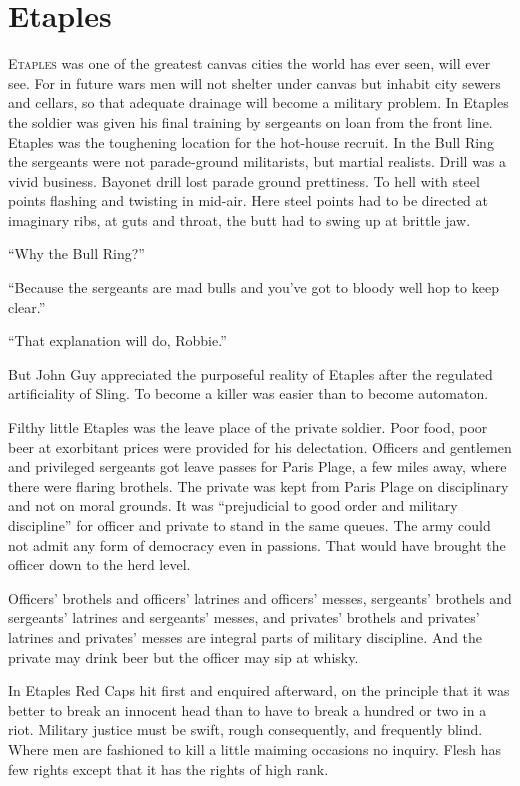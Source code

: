 \chapter*{\textsf{Etaples}}

E\textsc{taples} was one of the greatest canvas cities the world has 
ever seen, will ever see. For in future wars men will not shelter under 
canvas but inhabit city sewers and cellars, so that adequate drainage will 
become a military problem. In Etaples the soldier was given his final 
training by sergeants on loan from the front line. Etaples was the 
toughening location for the hot-house recruit. In the Bull Ring the 
sergeants were not parade-ground militarists, but martial realists. Drill 
was a vivid business. Bayonet drill lost parade ground prettiness. To 
hell with steel points flashing and twisting in mid-air. Here steel 
points had to be directed at imaginary ribs, at guts and throat, the 
butt had to swing up at brittle jaw.

``Why the Bull Ring?''

``Because the sergeants are mad bulls and you've got to bloody well hop to 
keep clear.''

``That explanation will do, Robbie.''

But John Guy appreciated the purposeful reality of Etaples after the 
regulated artificiality of Sling. To become a killer was easier than to 
become automaton.

Filthy little Etaples was the leave place of the private soldier. Poor food, 
poor beer at exorbitant prices were provided for his delectation. Officers 
and gentlemen and privileged sergeants got leave passes for Paris Plage, 
a few miles away, where there were flaring brothels. The private was kept 
from Paris Plage on disciplinary and not on moral grounds. It was ``prejudicial 
to good order and military discipline'' for officer and private to stand in the 
same queues. The army could not admit any form of democracy even in passions. 
That would have brought the officer down to the herd level.

Officers' brothels and officers' latrines and officers' messes, sergeants' 
brothels and sergeants' latrines and sergeants' messes, and privates' 
brothels and privates' latrines and privates' messes are integral parts of 
military discipline. And the private may drink beer but the officer may sip 
at whisky.

In Etaples Red Caps hit first and enquired afterward, on the principle that 
it was better to break an innocent head than to have to break a hundred or 
two in a riot. Military justice must be swift, rough consequently, and 
frequently blind. Where men are fashioned to kill a little maiming occasions 
no inquiry. Flesh has few rights except that it has the rights of high rank.

